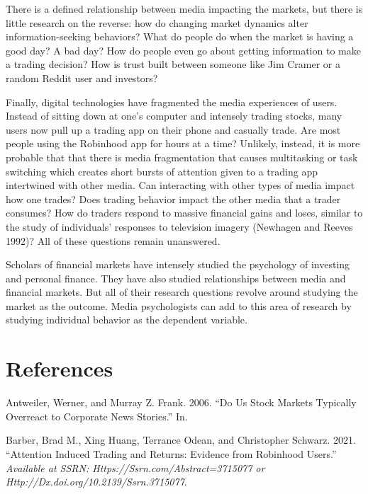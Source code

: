 \documentclass[12pt,]{article}
\begin{document}
There is a defined relationship between media impacting the markets, but
there is little research on the reverse: how do changing market dynamics
alter information-seeking behaviors? What do people do when the market
is having a good day? A bad day? How do people even go about getting
information to make a trading decision? How is trust built between
someone like Jim Cramer or a random Reddit user and investors?

Finally, digital technologies have fragmented the media experiences of
users. Instead of sitting down at one's computer and intensely trading
stocks, many users now pull up a trading app on their phone and casually
trade. Are most people using the Robinhood app for hours at a time?
Unlikely, instead, it is more probable that that there is media
fragmentation that causes multitasking or task switching which creates
short bursts of attention given to a trading app intertwined with other
media. Can interacting with other types of media impact how one trades?
Does trading behavior impact the other media that a trader consumes? How
do traders respond to massive financial gains and loses, similar to the
study of individuals' responses to television imagery (Newhagen and
Reeves 1992)? All of these questions remain unanswered.

Scholars of financial markets have intensely studied the psychology of
investing and personal finance. They have also studied relationships
between media and financial markets. But all of their research questions
revolve around studying the market as the outcome. Media psychologists
can add to this area of research by studying individual behavior as the
dependent variable.

\hypertarget{references}{%
\section*{References}\label{references}}

\hypertarget{refs}{}
\leavevmode\hypertarget{ref-antweiler2006}{}%
Antweiler, Werner, and Murray Z. Frank. 2006. ``Do Us Stock Markets
Typically Overreact to Corporate News Stories.'' In.

\leavevmode\hypertarget{ref-barber2021}{}%
Barber, Brad M., Xing Huang, Terrance Odean, and Christopher Schwarz.
2021. ``Attention Induced Trading and Returns: Evidence from Robinhood
Users.'' \emph{Available at SSRN: Https://Ssrn.com/Abstract=3715077 or
Http://Dx.doi.org/10.2139/Ssrn.3715077}.
\end{document}
